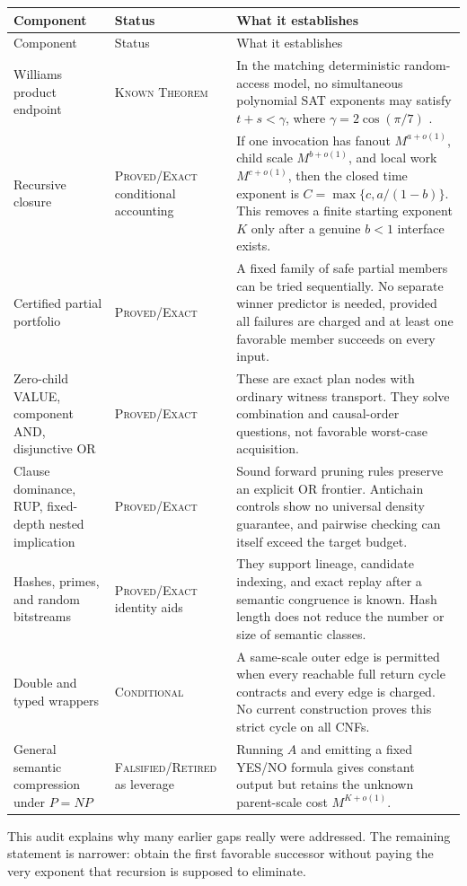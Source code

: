 \documentclass[11pt]{article}
\newcommand{\Exact}{\textsc{Proved/Exact}}
\newcommand{\Known}{\textsc{Known Theorem}}
\newcommand{\Conditional}{\textsc{Conditional}}
\newcommand{\Retired}{\textsc{Falsified/Retired}}
\begin{document}
\begin{longtable}{L{0.21\textwidth}L{0.205\textwidth}L{0.49\textwidth}}
\toprule
Component & Status & What it establishes \tabularnewline
\midrule
\endfirsthead
\toprule
Component & Status & What it establishes \tabularnewline
\midrule
\endhead
\bottomrule
\endfoot
Williams product endpoint & \Known{} & In the matching deterministic
random-access model, no simultaneous polynomial SAT exponents may satisfy
$t+s<\gamma$, where $\gamma=2\cos(\pi/7)$ \cite{williams2010}. \tabularnewline
Recursive closure & \Exact{} conditional accounting & If one invocation has
fanout $M^{a+o(1)}$, child scale $M^{b+o(1)}$, and local work
$M^{c+o(1)}$, then the closed time exponent is
$C=\max\{c,a/(1-b)\}$.  This removes a finite starting exponent $K$ only
after a genuine $b<1$ interface exists. \tabularnewline
Certified partial portfolio & \Exact{} & A fixed family of safe partial
members can be tried sequentially.  No separate winner predictor is needed,
provided all failures are charged and at least one favorable member succeeds
on every input. \tabularnewline
Zero-child VALUE, component AND, disjunctive OR & \Exact{} & These are exact
plan nodes with ordinary witness transport.  They solve combination and
causal-order questions, not favorable worst-case acquisition. \tabularnewline
Clause dominance, RUP, fixed-depth nested implication & \Exact{} & Sound
forward pruning rules preserve an explicit OR frontier.  Antichain controls
show no universal density guarantee, and pairwise checking can itself exceed
the target budget. \tabularnewline
Hashes, primes, and random bitstreams & \Exact{} identity aids & They support
lineage, candidate indexing, and exact replay after a semantic congruence is
known.  Hash length does not reduce the number or size of semantic classes.
\tabularnewline
Double and typed wrappers & \Conditional{} & A same-scale outer edge is
permitted when every reachable full return cycle contracts and every edge is
charged.  No current construction proves this strict cycle on all CNFs.
\tabularnewline
General semantic compression under $P=NP$ & \Retired{} as leverage & Running
$A$ and emitting a fixed YES/NO formula gives constant output but retains the
unknown parent-scale cost $M^{K+o(1)}$. \tabularnewline
\end{longtable}

This audit explains why many earlier gaps really were addressed.  The
remaining statement is narrower: obtain the first favorable successor
without paying the very exponent that recursion is supposed to eliminate.
\end{document}
